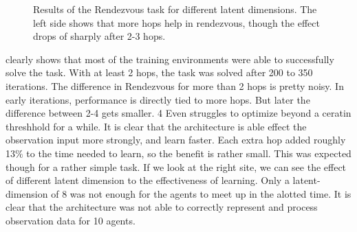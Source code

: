 \begin{figure}[htp]
    \centering
    \hspace{1cm}                       
    \caption{Results of the Rendezvous task for different latent dimensions. The left side shows that more hops help in rendezvous, though the effect drops of sharply after 2-3 hops. }
    \label{fig:proof_of_concept_rendezvous}
\end{figure}

 clearly shows that most of the training environments were able to successfully solve the task. With at least 2 hops, the task was solved after 200 to 350 iterations. The difference in Rendezvous for more than 2 hops is pretty noisy. In early iterations, performance is directly tied to more hops. But later the difference between 2-4 gets smaller. 4 Even struggles to optimize beyond a ceratin threshhold for a while. It is clear that the architecture is able effect the observation input more strongly, and learn faster. Each extra hop added roughly 13$\%$ to the time needed to learn, so the benefit is rather small. This was expected though for a rather simple task. If we look at the right site, we can see the effect of different latent dimension to the effectiveness of learning. Only a latent-dimension of 8 was not enough for the agents to meet up in the alotted time. It is clear that the architecture was not able to correctly represent and process observation data for 10 agents.\par

